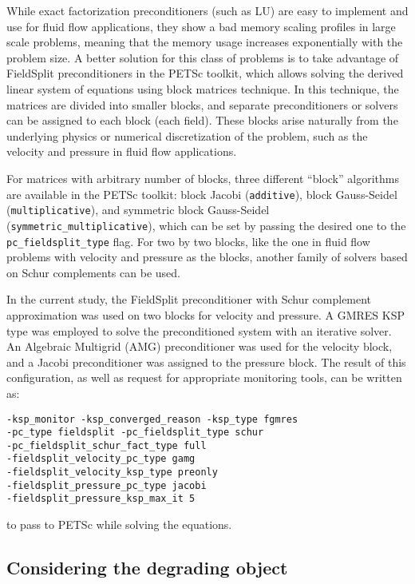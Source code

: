 While exact factorization preconditioners (such as LU) are easy to implement and use for fluid flow applications, they show a bad memory scaling profiles in large scale problems, meaning that the memory usage increases exponentially with the problem size. A better solution for this class of problems is to take advantage of FieldSplit preconditioners in the PETSc toolkit, which allows solving the derived linear system of equations using block matrices technique. In this technique, the matrices are divided into smaller blocks, and separate preconditioners or solvers can be assigned to each block (each field). These blocks arise naturally from the underlying physics or numerical discretization of the problem, such as the velocity and pressure in fluid flow applications.

For matrices with arbitrary number of blocks, three different ``block'' algorithms are available in the PETSc toolkit: block Jacobi (\verb|additive|), block Gauss-Seidel (\verb|multiplicative|), and symmetric block Gauss-Seidel \\ (\verb|symmetric_multiplicative|), which can be set by passing the desired one to the \verb|pc_fieldsplit_type| flag. For two by two blocks, like the one in fluid flow problems with velocity and pressure as the blocks, another family of solvers based on Schur complements can be used.

In the current study, the FieldSplit preconditioner with Schur complement approximation was used on two blocks for velocity and pressure. A GMRES KSP type \cite{Saad1986} was employed to solve the preconditioned system with an iterative solver. An Algebraic Multigrid (AMG) preconditioner \cite{mccormick1987} was used for the velocity block, and a Jacobi preconditioner was assigned to the pressure block. The result of this configuration, as well as request for appropriate monitoring tools, can be written as:
\begin{verbatim}
-ksp_monitor -ksp_converged_reason -ksp_type fgmres
-pc_type fieldsplit -pc_fieldsplit_type schur
-pc_fieldsplit_schur_fact_type full
-fieldsplit_velocity_pc_type gamg
-fieldsplit_velocity_ksp_type preonly
-fieldsplit_pressure_pc_type jacobi
-fieldsplit_pressure_ksp_max_it 5 \end{verbatim}
to pass to PETSc while solving the equations.


\subsection{Considering the degrading object}

